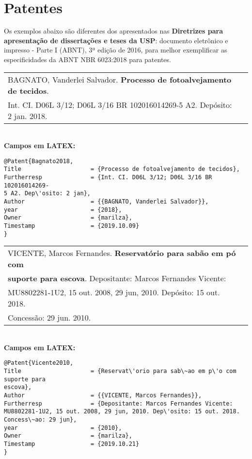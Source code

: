 \section{Patentes}

Os exemplos abaixo s\~ao diferentes dos apresentados nas \textbf{Diretrizes para apresenta\c{c}\~ao de disserta\c{c}\~oes e teses da USP}: documento eletr\^onico e impresso - Parte I (ABNT), 3ª edi\c{c}\~ao de 2016, para melhor exemplificar as especificidades da ABNT NBR 6023:2018 para patentes. \\

\begin{tabular}{|l|c|} \hline
	BAGNATO, Vanderlei Salvador. \textbf{Processo de fotoalvejamento de tecidos}. \\ 
	Int. CI. D06L 3/12; D06L 3/16 BR 102016014269-5 A2. Dep\'osito: 2 jan. 2018.
	\\\hline
\end{tabular} \\

\textbf{Campos em LATEX:} 

\begin{verbatim}
@Patent{Bagnato2018,
Title                    = {Processo de fotoalvejamento de tecidos},
Furtherresp              = {Int. CI. D06L 3/12; D06L 3/16 BR 102016014269-
5 A2. Dep\'osito: 2 jan},
Author                   = {{BAGNATO, Vanderlei Salvador}},
year                     = {2018},
Owner                    = {marilza},
Timestamp                = {2019.10.09}
}
\end{verbatim}



\begin{tabular}{|l|c|} \hline
	VICENTE, Marcos Fernandes. \textbf{Reservat\'orio para sab\~ao em p\'o com} \\ 
	\textbf{suporte para escova}. Depositante: Marcos Fernandes Vicente: \\
	MU8802281-1U2, 15 out. 2008, 29 jun, 2010. Dep\'osito: 15 out. 2018. \\
	Concess\~ao: 29 jun. 2010.
	\\\hline
\end{tabular} \\


\textbf{Campos em LATEX:} 

\begin{verbatim}
@Patent{Vicente2010,
Title                    = {Reservat\'orio para sab\~ao em p\'o com suporte para 
escova},
Author                   = {{VICENTE, Marcos Fernandes}},
Furtherresp              = {Depositante: Marcos Fernandes Vicente: 
MU8802281-1U2, 15 out. 2008, 29 jun, 2010. Dep\'osito: 15 out. 2018. 
Concess\~ao: 29 jun},
year                     = {2010},
Owner                    = {marilza},
Timestamp                = {2019.10.21}
}
\end{verbatim}

